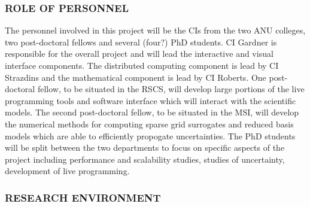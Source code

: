 \documentclass[a4paper,fontsize=12pt]{scrartcl}
\begin{document}
\subsubsection*{ROLE OF PERSONNEL}

%


The personnel involved in this project will be the CIs from the two ANU colleges, two post-doctoral fellows and several (four?) PhD students. %
CI Gardner is responsible for the overall project and will lead the interactive and visual interface components. The distributed computing component is lead by CI Strazdins and the mathematical component is lead by CI Roberts. One post-doctoral fellow, to be situated in the RSCS, will develop large portions of the live programming tools and software interface which will interact with the scientific models. The second post-doctoral fellow, to be situated in the MSI, will develop the numerical methods for computing sparse grid surrogates and reduced basis models which are able to efficiently propogate uncertainties. The PhD students will be split between the two departments to focus on specific aspects of the project including performance and scalability studies, studies of uncertainty, development of live programming.

\subsubsection*{RESEARCH ENVIRONMENT}
\end{document}
